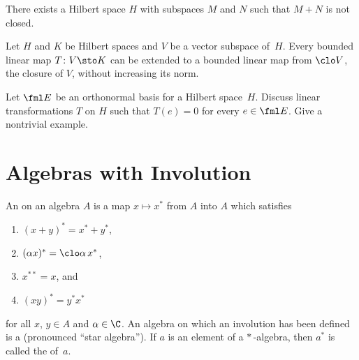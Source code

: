 \begin{exam} There exists a Hilbert space $H$ with subspaces $M$ and $N$ such that $M + N$ is not closed.
\end{exam}

\begin{prop} Let $H$ and $K$ be Hilbert spaces and $V$ be a vector subspace of~$H$.  Every bounded linear map
$T\colon V \sto K$ can be extended to a bounded linear map from $\clo V$, the closure of $V$, without increasing its norm.
\end{prop}

\begin{exer} Let $\fml E$ be an orthonormal basis for a Hilbert space~$H$. Discuss linear transformations $T$ on $H$
such that $T(e) = 0$ for every $e \in \fml E$.  Give a nontrivial example.
\end{exer}






















\section{Algebras with Involution}
\begin{defn}\label{00109}  An
 on an algebra $A$ is a map $x \mapsto x^\ast$ from $A$ into $A$ which satisfies
  \begin{enumerate}
    \item[(a)] $(x + y)^\ast = x^\ast + y^\ast$,
    \item[(b)] $(\alpha x)^* = \clo\alpha\, x^*$,
    \item[(c)] $x^{\ast\ast} = x$, and
    \item[(d)] $(xy)^\ast = y^\ast x^\ast$
  \end{enumerate}
for all $x$, $y \in A$ and $\alpha \in \C$.  An algebra on which an involution has been defined is a
 (pronounced ``star algebra''). If $a$ is an element of a $*\,$-algebra, then $a^*$ is called the
 of~$a$.
\end{defn}


